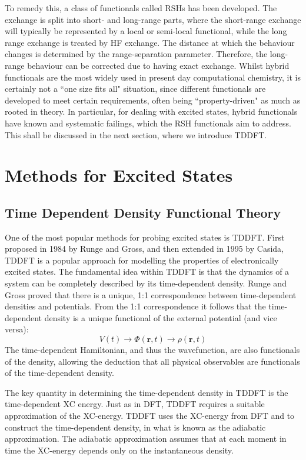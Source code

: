 To remedy this, a class of functionals called \acp{RSH} has been developed. The exchange is split into short- and long-range parts, where the short-range exchange will typically be represented by a local or semi-local functional, while the long range exchange is treated by \ac{HF} exchange. The distance at which the behaviour changes is determined by the range-separation parameter. Therefore, the long-range behaviour can be corrected due to having exact exchange. Whilst hybrid functionals are the most widely used in present day computational chemistry, it is certainly not a ``one size fits all" situation, since different functionals are developed to meet certain requirements, often being ``property-driven" as much as rooted in theory. In particular, for dealing with excited states, hybrid functionals have known and systematic failings, which the \ac{RSH} functionals aim to address. This shall be discussed in the next section, where we introduce \ac{TDDFT}.
\section{Methods for Excited States}
\subsection{Time Dependent Density Functional Theory}\label{section: tddft}
One of the most popular methods for probing excited states is \acf{TDDFT}. First proposed in 1984 by Runge and Gross, and then extended in 1995 by Casida, TDDFT is a popular approach for modelling the properties of electronically excited states. The fundamental idea within TDDFT is that the dynamics of a system can be completely described by its time-dependent density. Runge and Gross proved that there is a unique, 1:1 correspondence between time-dependent densities and potentials.\cite{Runge1984} From the 1:1 correspondence it follows that the time-dependent density is a unique functional of the external potential (and vice versa):
\begin{equation}
    V(t)\rightarrow\Phi(\bm{r},t)\rightarrow\rho(\bm{r},t)
\end{equation}
The time-dependent Hamiltonian, and thus the wavefunction, are also functionals of the density, allowing the deduction that all physical observables are functionals of the time-dependent density.

The key quantity in determining the time-dependent density in \ac{TDDFT} is the time-dependent \acf{XC} energy. Just as in \ac{DFT}, \ac{TDDFT} requires a suitable approximation of the \ac{XC}-energy. \ac{TDDFT} uses the \ac{XC}-energy from \ac{DFT} and to construct the time-dependent density, in what is known as the adiabatic approximation. The adiabatic approximation assumes that at each moment in time the \ac{XC}-energy depends only on the instantaneous density.\cite{Ullrich2012}

